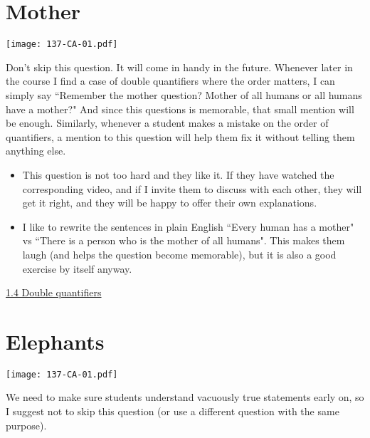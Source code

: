 \documentclass[11pt]{article}
\newcommand{\n}{\newpage}
\newcommand{\nl}{\hfill \vspace{-1.1\baselineskip}} %
\newcommand{\vfour}{\hspace{8mm}\href{https://www.youtube.com/watch?v=h1milgIk4U8&list=PLlwePzQY_wW-CPzhk-af-MXj9knthD1gx&index=4}{1.4 Double quantifiers}}
\begin{document}
\n
\newpage
\section{Mother} 

\begin{center}
{ \texttt{[image: 137-CA-01.pdf]}}
\end{center}

\begin{warning}
Don't skip this question.  It will come in handy in the future.  Whenever later in the course I find a case of double quantifiers where the order matters, I can simply say ``Remember the mother question?  Mother of all humans or all humans have a mother?"  And since this questions is memorable, that small mention will be enough.  Similarly, whenever a student makes a mistake on the order of quantifiers, a mention to this question will help them fix it without telling them anything else.
\end{warning}

\begin{comments}
\nl
\begin{itemize}
	\item  This question is not too hard and they like it.  If they have watched the corresponding video, and if I invite them to discuss with each other, they will get it right, and they will be happy to offer their own explanations.
	\item I like to rewrite the sentences in plain English ``Every human has a mother" vs ``There is a person who is the mother of all humans".  This makes them laugh (and helps the question become memorable), but it is also a good exercise by itself anyway.
\end{itemize}
\end{comments}

\begin{videos}
\vfour
\end{videos}

\n
\newpage
\section{Elephants} 

\begin{center}
{ \texttt{[image: 137-CA-01.pdf]}}
\end{center}

\begin{warning}
 We need to make sure students understand vacuously true statements early on, so I suggest not to skip this question (or use a different question with the same purpose).
\end{warning}
\end{document}
